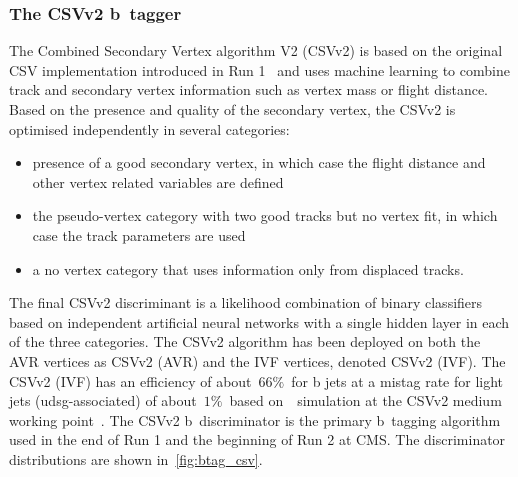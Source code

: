 \subsubsection{The CSVv2 b~tagger}
The Combined Secondary Vertex algorithm V2 (CSVv2) is based on the original CSV implementation introduced in Run 1~\cite{Chatrchyan:2012jua} and uses machine learning to combine track and secondary vertex information such as vertex mass or flight distance. Based on the presence and quality of the secondary vertex, the CSVv2 is optimised independently in several categories:
\begin{itemize}
\item presence of a good secondary vertex, in which case the flight distance and other vertex related variables are defined
\item the pseudo-vertex category with two good tracks but no vertex fit, in which case the track parameters are used
\item a no vertex category that uses information only from displaced tracks.
\end{itemize}
The final CSVv2 discriminant is a likelihood combination of binary classifiers based on independent artificial neural networks with a single hidden layer in each of the three categories. The CSVv2 algorithm has been deployed on both the AVR vertices as CSVv2 (AVR) and the IVF vertices, denoted CSVv2 (IVF). The CSVv2 (IVF) has an efficiency of about~$66\%$~for b jets at a mistag rate for light jets (udsg-associated) of about~$1\%$~based on~\ttbar~simulation at the CSVv2 medium working point~\cite{CMS-PAS-BTV-15-001}. The CSVv2 b~discriminator is the primary b~tagging algorithm used in the end of Run 1 and the beginning of Run 2 at CMS. The discriminator distributions are shown in~\cref{fig:btag_csv}.


